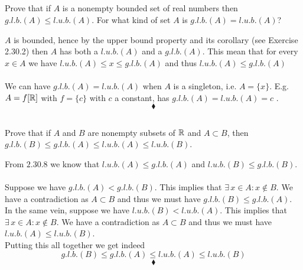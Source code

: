\subsection{}
\begin{tcolorbox}

Prove that if $A$ is a nonempty bounded set of real numbers then $g.l.b. (A) \leq l.u.b. (A)$. For what kind of set $A$ is $g.l.b. (A) =l.u.b. (A)$? 
\end{tcolorbox}
$A$ is bounded, hence by the upper bound property and its corollary (see Exercise 2.30.2) then $A$ has both a $l.u.b.(A)$  and a $g.l.b.(A)$. This mean that for every $x\in A$ we have $l.u.b.(A)\leq x\leq g.l.b.(A)$ and thus $l.u.b.(A)\leq g.l.b.(A)$\\\\
We can have $g.l.b. (A) =l.u.b. (A)$ when $A$ is a singleton, i.e. $A=\{x\}$. E.g. $A=f[\mathbb{R}]$ with $f=\{c\}$ with $c$ a constant, has $g.l.b. (A) =l.u.b. (A)=c$ .
$$\blacklozenge$$



\subsection{}
\begin{tcolorbox}
Prove that if $A$ and $B$ are nonempty subsets of $\mathbb{R}$ and $A \subset B$, then $g.l.b. (B) \leq g.l.b. (A)\leq  l.u.b. (A) \leq l.u.b. (B)$. 
\end{tcolorbox}
From $\mathbf{2.30.8}$ we know that $l.u.b.(A)\leq g.l.b.(A)$ and $l.u.b.(B)\leq g.l.b.(B)$. \\\\
Suppose we have $g.l.b.(A)< g.l.b.(B)$. This implies that $\exists\, x\in A: x\not \in B$. We have a contradiction as $A\subset B$ and thus we must have $g.l.b.(B)\leq g.l.b.(A)$.\\
In the same vein, suppose we have $l.u.b.(B)< l.u.b.(A)$. This implies that $\exists\, x\in A: x\not \in B$. We have a contradiction as $A\subset B$ and thus we must have $l.u.b.(A)\leq l.u.b.(B)$. \\
Putting this all together we get indeed
$$g.l.b. (B) \leq g.l.b. (A)\leq  l.u.b. (A) \leq l.u.b. (B)$$
$$\blacklozenge$$
\newpage

